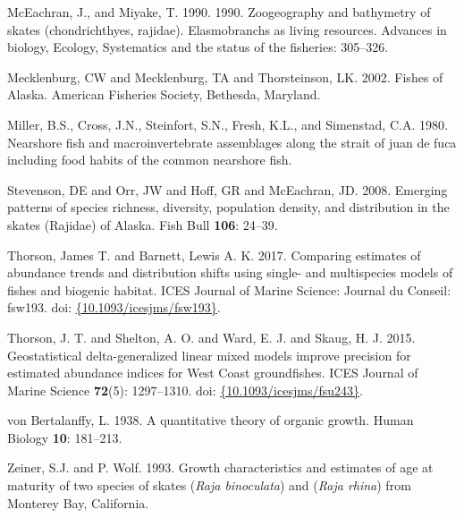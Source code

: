 \documentclass[12pt,]{article}
\begin{document}
\leavevmode\hypertarget{ref-McEachran1990}{}%
McEachran, J., and Miyake, T. 1990. 1990. Zoogeography and bathymetry of
skates (chondrichthyes, rajidae). Elasmobranchs as living resources.
Advances in biology, Ecology, Systematics and the status of the
fisheries: 305--326.

\leavevmode\hypertarget{ref-Mecklenburg2002}{}%
Mecklenburg, CW and Mecklenburg, TA and Thorsteinson, LK. 2002. Fishes
of Alaska. American Fisheries Society, Bethesda, Maryland.

\leavevmode\hypertarget{ref-Miller1980}{}%
Miller, B.S., Cross, J.N., Steinfort, S.N., Fresh, K.L., and Simenstad,
C.A. 1980. Nearshore fish and macroinvertebrate assemblages along the
strait of juan de fuca including food habits of the common nearshore
fish.

\leavevmode\hypertarget{ref-Stevenson2008}{}%
Stevenson, DE and Orr, JW and Hoff, GR and McEachran, JD. 2008. Emerging
patterns of species richness, diversity, population density, and
distribution in the skates (Rajidae) of Alaska. Fish Bull \textbf{106}:
24--39.

\leavevmode\hypertarget{ref-Thorson2017a}{}%
Thorson, James T. and Barnett, Lewis A. K. 2017. Comparing estimates of
abundance trends and distribution shifts using single- and multispecies
models of fishes and biogenic habitat. ICES Journal of Marine Science:
Journal du Conseil: fsw193. doi:
\href{https://doi.org/\%7B10.1093/icesjms/fsw193\%7D}{\{10.1093/icesjms/fsw193\}}.

\leavevmode\hypertarget{ref-Thorson2015}{}%
Thorson, J. T. and Shelton, A. O. and Ward, E. J. and Skaug, H. J. 2015.
Geostatistical delta-generalized linear mixed models improve precision
for estimated abundance indices for West Coast groundfishes. ICES
Journal of Marine Science \textbf{72}(5): 1297--1310. doi:
\href{https://doi.org/\%7B10.1093/icesjms/fsu243\%7D}{\{10.1093/icesjms/fsu243\}}.

\leavevmode\hypertarget{ref-vonBertalanffy1938}{}%
von Bertalanffy, L. 1938. A quantitative theory of organic growth. Human
Biology \textbf{10}: 181--213.

\leavevmode\hypertarget{ref-ZeinerWolf1993}{}%
Zeiner, S.J. and P. Wolf. 1993. Growth characteristics and estimates of
age at maturity of two species of skates (\emph{Raja binoculata}) and
(\emph{Raja rhina}) from Monterey Bay, California.
\end{document}
